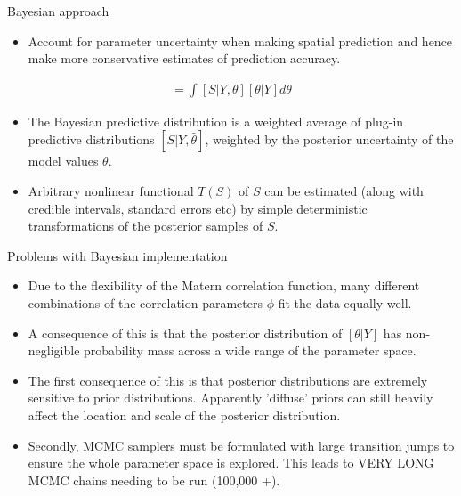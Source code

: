 \documentclass{beamer}
\begin{document}
\begin{frame}{Bayesian approach}

\begin{itemize}
\item Account for parameter uncertainty when making spatial prediction and hence make more conservative estimates of prediction accuracy.
\end{itemize}

\begin{align*}
[S | Y ] = \int [S | Y, \theta ] [ \theta | Y ] d \theta
\end{align*}

\begin{itemize}
\item The Bayesian predictive distribution is a weighted average of plug-in predictive distributions $[S | Y, \hat{\theta} ]$, weighted by the posterior uncertainty of the model values $\theta$.
\item Arbitrary nonlinear functional $T(S)$ of $S$ can be estimated (along with credible intervals, standard errors etc) by simple deterministic transformations of the posterior samples of $S$.
\end{itemize}

\end{frame}

\begin{frame}{Problems with Bayesian implementation}

\begin{itemize}
\item Due to the flexibility of the Matern correlation function, many different combinations of the correlation parameters $\phi$ fit the data equally well.
\item A consequence of this is that the posterior distribution of $[\theta | Y]$ has non-negligible probability mass across a wide range of the parameter space.
\item The first consequence of this is that posterior distributions are extremely sensitive to prior distributions. Apparently 'diffuse' priors can still heavily affect the location and scale of the posterior distribution.
\item Secondly, MCMC samplers must be formulated with large transition jumps to ensure the whole parameter space is explored. This leads to VERY LONG MCMC chains needing to be run (100,000 +).
\end{itemize}

\end{frame}
\end{document}
